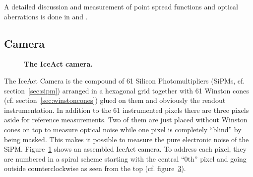 A detailed discussion and measurement of point spread functions and optical aberrations is done in \cite{famous:niggemann} and \cite{famous:eichler}.

\subsection{Camera}\label{iceact:model:camera}

\begin{figure}[H]
	\centering
	\begin{subfigure}[t]{0.49\textwidth}
		\label{iceact:camera:picture}	
	\end{subfigure}
	\hfill
	\begin{subfigure}[t]{0.49\textwidth}
		\usebox{\savedimage}
		\label{iceact:camera:pixelnumbering}	
	\end{subfigure}
	\caption[The IceAct camera]{\textbf{The IceAct camera.}}	
\end{figure}

The IceAct Camera is the compound of 61 Silicon Photomultipliers (SiPMs, cf. section~\ref{sec:sipm}) arranged in a hexagonal grid together with 61 Winston cones (cf. section~\ref{sec:winstoncones}) glued on them and obviously the readout instrumentation. In addition to the 61 instrumented pixels there are three pixels aside for reference measurements. Two of them are just placed without Winston cones on top to measure optical noise while one pixel is completely \enquote{blind} by being masked. This makes it possible to measure the pure electronic noise of the SiPM. Figure~\ref{iceact:camera:picture} shows an assembled IceAct camera. To address each pixel, they are numbered in a spiral scheme starting with the central \enquote{0$\text{th}$} pixel and going outside counterclockwise as seen from the top (cf. figure~\ref{iceact:camera:pixelnumbering}).

